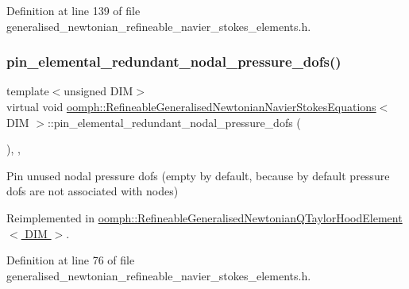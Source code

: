 Definition at line 139 of file generalised\+\_\+newtonian\+\_\+refineable\+\_\+navier\+\_\+stokes\+\_\+elements.\+h.

\mbox{\label{classoomph_1_1RefineableGeneralisedNewtonianNavierStokesEquations_a9a4ca54f9b1f7d1b783b5ee0c561a236}} 
\subsubsection{\texorpdfstring{pin\+\_\+elemental\+\_\+redundant\+\_\+nodal\+\_\+pressure\+\_\+dofs()}{pin\_elemental\_redundant\_nodal\_pressure\_dofs()}}
{\footnotesize\ttfamily template$<$unsigned D\+IM$>$ \\
virtual void \hyperlink{classoomph_1_1RefineableGeneralisedNewtonianNavierStokesEquations}{oomph\+::\+Refineable\+Generalised\+Newtonian\+Navier\+Stokes\+Equations}$<$ D\+IM $>$\+::pin\+\_\+elemental\+\_\+redundant\+\_\+nodal\+\_\+pressure\+\_\+dofs (\begin{DoxyParamCaption}{ }\end{DoxyParamCaption})\hspace{0.3cm}{\ttfamily [inline]}, {\ttfamily [protected]}, {\ttfamily [virtual]}}



Pin unused nodal pressure dofs (empty by default, because by default pressure dofs are not associated with nodes) 



Reimplemented in \hyperlink{classoomph_1_1RefineableGeneralisedNewtonianQTaylorHoodElement_a809f295d07ea41ff6a71cf15ffb82692}{oomph\+::\+Refineable\+Generalised\+Newtonian\+Q\+Taylor\+Hood\+Element$<$ D\+I\+M $>$}.



Definition at line 76 of file generalised\+\_\+newtonian\+\_\+refineable\+\_\+navier\+\_\+stokes\+\_\+elements.\+h.



